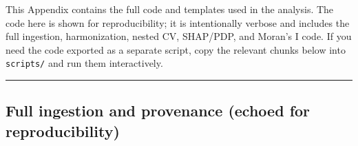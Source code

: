 \documentclass[
  11pt,
]{article}
\begin{document}
This Appendix contains the full code and templates used in the analysis.
The code here is shown for reproducibility; it is intentionally verbose
and includes the full ingestion, harmonization, nested CV, SHAP/PDP, and
Moran's I code. If you need the code exported as a separate script, copy
the relevant chunks below into \texttt{scripts/} and run them
interactively.

\begin{center}\rule{0.5\linewidth}{0.5pt}\end{center}

\subsection{Full ingestion and provenance (echoed for
reproducibility)}\label{full-ingestion-and-provenance-echoed-for-reproducibility}
\end{document}
